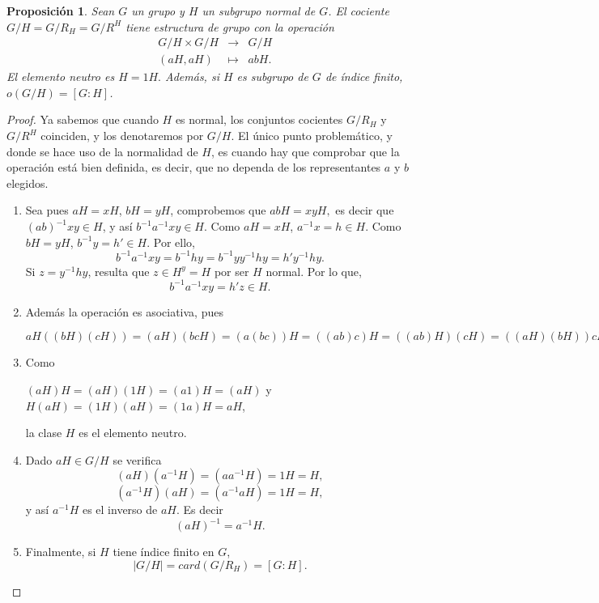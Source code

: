 \documentclass[12pt]{article}
\newtheorem{proposition}[theorem]{Proposición}
\begin{document}
\begin{proposition}\label{eq:cociente} Sean $G$ un grupo y $H$ un subgrupo normal de $G$. El cociente $G/H = G/R_{H} = G/R^{H}$ tiene estructura de grupo con la operación $$\begin{array}{rccl}
&G/H \times G/H & \longrightarrow & G/H\\
&(aH,aH) & \longmapsto &abH.
\end{array}
$$
El elemento neutro es $H=1H.$ Además, si $H$ es subgrupo de $G$ de índice finito, $o(G/H) = \left[ G:H \right]$.
\end{proposition}
\begin{proof}
Ya sabemos que cuando $H$ es normal, los conjuntos cocientes $G/R_{H}$ y $G/R^{H}$ coinciden, y los denotaremos por $G/H$. El único punto problemático, y donde se hace uso de la normalidad de $H$, es cuando hay que comprobar que la operación está bien definida, es decir, que no dependa de los representantes $a$ y $b$ elegidos.
\begin{enumerate}
\item Sea pues $aH = xH$, $bH = yH$, comprobemos que $abH =xyH,$ es decir que $(ab)^{-1}xy \in H$, y así $b^{-1}a^{-1}xy \in H.$
Como $aH = xH$, $a^{-1}x = h \in H$. Como $bH = yH$, $b^{-1}y = h' \in H$. Por ello, $$b^{-1}a^{-1}xy = b^{-1}hy = b^{-1}yy^{-1}hy = h'y^{-1}hy.$$
Si $z = y^{-1}hy$, resulta que  $z \in H^{y} = H$ por ser $H$ normal. Por lo que, $$b^{-1}a^{-1}xy = h'z \in H.$$
\item Además la operación es asociativa, pues \begin{center}$aH((bH)(cH)) = (aH)(bcH) = (a(bc))H = ((ab)c)H = ((ab)H)(cH) = ((aH)(bH))cH.$\end{center}
\item Como
\begin{center}
$(aH)H=(aH)(1H)=(a1)H=(aH)$ y\\
$H(aH)=(1H)(aH)=(1a)H=aH$,
\end{center}
la clase $H$ es el elemento neutro. 
\item Dado $aH \in G/H$ se verifica $$(aH)(a^{-1}H) = (aa^{-1}H) = 1H = H,$$ $$(a^{-1}H)(aH) = (a^{-1}aH) = 1H = H,$$ y así $a^{-1}H$ es el inverso de $aH$. Es decir $$(aH)^{-1} = a^{-1}H.$$
\item Finalmente, si $H$ tiene índice finito en $G$, $$|G/H| = card(G/R_{H}) = \left[ G:H \right].$$
\end{enumerate}

\end{proof}
\end{document}
